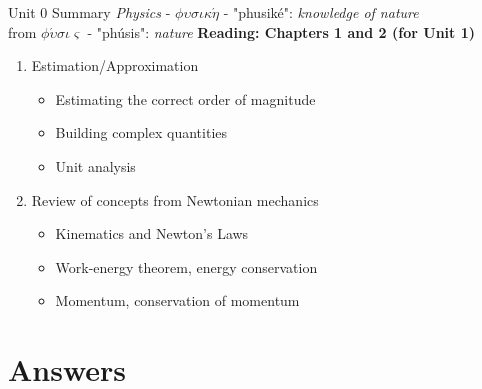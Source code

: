 \documentclass{beamer}
\begin{document}
\begin{frame}{Unit 0 Summary}
\textit{Physics} - $\phi\upsilon\sigma\iota\kappa\acute{\eta}$ - "phusik\'e": \textit{knowledge of nature} \\
from $\phi\acute{\upsilon}\sigma\iota\varsigma$ - "ph\'usis": \textit{nature}
\textbf{Reading: Chapters 1 and 2 (for Unit 1)}
\begin{enumerate}
\item Estimation/Approximation
\begin{itemize}
\item \alert{Estimating} the correct order of magnitude
\item \alert{Building} complex quantities
\item \alert{Unit analysis}
\end{itemize}
\item Review of concepts from Newtonian mechanics
\begin{itemize}
\item Kinematics and \alert{Newton's Laws}
\item Work-energy theorem, energy conservation
\item Momentum, conservation of momentum
\end{itemize}
\end{enumerate}
\end{frame}

\section{Answers}
\end{document}
